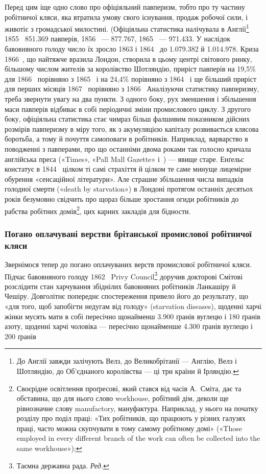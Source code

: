 
Перед цим іще одно слово про офіціяльний павперизм, тобто
про ту частину робітничої кляси, яка втратила умову свого існування,
продаж робочої сили, і животіє з громадської милостині.
(Офіціяльна статистика налічувала в Англії\footnote{
До Англії завжди залічують Велз, до Великобрітанії — Англію,
Велз і Шотляндію, до Об’єднаного королівства — ці три країни й Ірляндію.
} 1855~ \num{851.369} павперів,
1856~ — \num{877.767}, 1865~ — \num{971.433}. У наслідок бавовняного
голоду число їх зросло 1863 і 1864~ до \num{1.079.382}
й \num{1.014.978}. Криза 1866~, що найтяжче вразила Лондон, створила
в цьому центрі світового ринку, більшому числом жителів
за королівство Шотляндію, приріст павперів на 19,5\% для
1866~ порівняно з 1865~ і на 24,4\% порівняно з 1864~ і ще
більший приріст для перших місяців 1867~ порівняно з
1866~ Аналізуючи статистику павперизму, треба звернути увагу
на два пункти. З одного боку, рух зменшення і збільшення маси
павперів відбиває в собі періодичні зміни промислового циклу.
З другого боку, офіціяльна статистика стає чимраз більш фалшивим
показником дійсних розмірів павперизму в міру того,
як з акумуляцією капіталу розвивається клясова боротьба, а
тому й почуття самоповаги в робітників. Наприклад, варварство
в поводженні з павперами, про що останніми двома роками так
голосно кричала англійська преса («Times», «Pall Mall Gazette»
і~) — явище старе. Енґельс констатує в 1844~ цілком
ті самі страхіття й цілком те саме минуще лицемірне обурення
«сенсаційної літератури». Але страшне збільшення числа випадків
голодної смерти («death by starvation») в Лондоні протягом
останніх десятьох років безумовно свідчить про щораз більше зростання
огиди робітників до рабства робітних домів\footnote{
Своєрідне освітлення проґресові, який стався від часів А.~Сміта,
дає та обставина, що для нього слово workhouse, робітний дім, деколи ще
рівнозначне слову manufactory, мануфактура. Наприклад, у нього на
початку розділу про поділ праці: «Тих робітників, що працюють у різних
галузях праці, часто можна скупчувати в тому самому робітному домі»
(«Those employed in every different branch of the work can often be collected
into the same workhouse»);
}, цих карних
закладів для бідности.

\subsubsection{Погано оплачувані верстви брітанської промислової робітничої
кляси}

Звернімося тепер до погано оплачуваних верств промислової
робітничої кляси. Підчас бавовняного голоду 1862~ Privy
Council\footnote*{
Таємна державна рада. \emph{Ред.}
} доручив докторові Смітові розслідити стан харчування
збіднілих бавовняних робітників Ланкашіру й Чешіру. Довголітнє
попереднє спостереження привело його до результату, що
«для того, щоб запобігти недугам від голоду» (starvation diseases),
щоденні харчі жінки мусять мати в собі пересічно щонайменш
\num{3.900} ґранів вуглецю і 180 ґранів азоту, щоденні харчі
чоловіка — пересічно щонайменше \num{4.300} ґранів вуглецю і 200 ґранів
\parbreak{}  %
